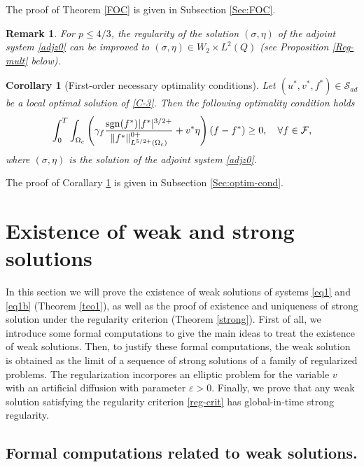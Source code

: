 \documentclass[11pt,reqno]{amsart}%
\newtheorem{corollary}[theorem]{Corollary}
\newtheorem{remark}{Remark}[section]
\numberwithin{equation}{section}
\begin{document}
 The proof of Theorem \ref{FOC} is given in Subsection \ref{Sec:FOC}.
  \begin{remark}
 For $p\le 4/3$, the regularity of the solution $(\sigma,\eta)$ of the adjoint system \eqref{adjz0} can be improved to  
 $(\sigma,\eta)\in W_2 \times L^{2}(Q)$  (see Proposition \ref{Reg-mult} below).
% 
 \end{remark}
  \begin{corollary}[First-order necessary optimality conditions]  \label{optim-cond}
 Let $(u^*,v^*,f^*)\in \mathcal{S}_{ad}$ be a local optimal solution of  \eqref{C-3}.
 Then the following optimality condition holds
\begin{equation}\label{L-3}
\int_0^T\int_{\Omega_c}\left(
\gamma_f 
\frac{{\rm sgn}(f^{*})\vert f^{*}\vert^{3/2+}}
{\| f^* \|_{L^{5/2+}(\Omega_c)}^{0+}}
+{v^*}\eta\right) (f-f^*)\ge0,\ \ \ \forall f\in\mathcal{F},
\end{equation}
where $(\sigma,\eta)$ is the solution of the adjoint system \eqref{adjz0}.
 \end{corollary}
 The proof of Corallary \ref{optim-cond} is given in Subsection \ref{Sec:optim-cond}.
 
\section{Existence of weak and strong solutions}

In this section we will prove the existence of weak  solutions of systems \eqref{eq1} and \eqref{eq1b} (Theorem \ref{teo1}), 
as well as the proof of existence and uniqueness of strong solution under the regularity criterion (Theorem \ref{strong}).
First of all, we introduce some formal computations to give the main ideas to treat the existence of weak solutions. Then, to justify these formal computations, the weak solution is obtained as the limit of a sequence of strong solutions of a family of regularized problems. 
The regularization incorpores an elliptic problem for the variable $v$ with an artificial diffusion with parameter $\varepsilon>0.$ 
Finally, we prove that any  weak solution satisfying  the regularity criterion \eqref{reg-crit} has global-in-time strong regularity.


\subsection {Formal computations related to weak solutions.}\label{Sec:FormalComput}
\end{document}
